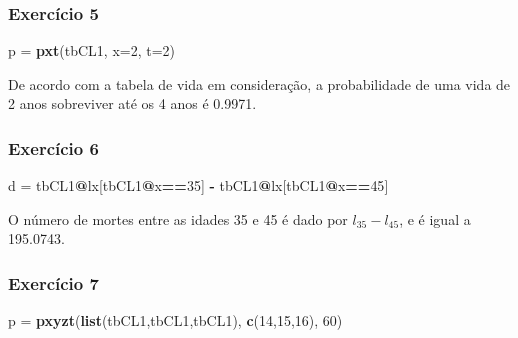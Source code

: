\documentclass[]{article}
\newenvironment{Shaded}{\begin{snugshade}}{\end{snugshade}}
\newcommand{\DataTypeTok}[1]{\textcolor[rgb]{0.13,0.29,0.53}{#1}}
\newcommand{\DecValTok}[1]{\textcolor[rgb]{0.00,0.00,0.81}{#1}}
\newcommand{\KeywordTok}[1]{\textcolor[rgb]{0.13,0.29,0.53}{\textbf{#1}}}
\newcommand{\NormalTok}[1]{#1}
\newcommand{\OperatorTok}[1]{\textcolor[rgb]{0.81,0.36,0.00}{\textbf{#1}}}
\newcommand{\StringTok}[1]{\textcolor[rgb]{0.31,0.60,0.02}{#1}}
\begin{document}
\hypertarget{exercicio-5}{%
\subsubsection{Exercício 5}\label{exercicio-5}}

\begin{Shaded}
\begin{Highlighting}[]
\NormalTok{p =}\StringTok{ }\KeywordTok{pxt}\NormalTok{(tbCL1, }\DataTypeTok{x=}\DecValTok{2}\NormalTok{, }\DataTypeTok{t=}\DecValTok{2}\NormalTok{)}
\end{Highlighting}
\end{Shaded}

De acordo com a tabela de vida em consideração, a probabilidade de uma
vida de 2 anos sobreviver até os 4 anos é 0.9971.

\hypertarget{exercicio-6}{%
\subsubsection{Exercício 6}\label{exercicio-6}}

\begin{Shaded}
\begin{Highlighting}[]
\NormalTok{d =}\StringTok{ }\NormalTok{tbCL1}\OperatorTok{@}\NormalTok{lx[tbCL1}\OperatorTok{@}\NormalTok{x}\OperatorTok{==}\DecValTok{35}\NormalTok{] }\OperatorTok{-}\StringTok{ }\NormalTok{tbCL1}\OperatorTok{@}\NormalTok{lx[tbCL1}\OperatorTok{@}\NormalTok{x}\OperatorTok{==}\DecValTok{45}\NormalTok{]}
\end{Highlighting}
\end{Shaded}

O número de mortes entre as idades 35 e 45 é dado por
\(l_{35} - l_{45}\), e é igual a 195.0743.

\hypertarget{exercicio-7}{%
\subsubsection{Exercício 7}\label{exercicio-7}}

\begin{Shaded}
\begin{Highlighting}[]
\NormalTok{p =}\StringTok{ }\KeywordTok{pxyzt}\NormalTok{(}\KeywordTok{list}\NormalTok{(tbCL1,tbCL1,tbCL1), }\KeywordTok{c}\NormalTok{(}\DecValTok{14}\NormalTok{,}\DecValTok{15}\NormalTok{,}\DecValTok{16}\NormalTok{), }\DecValTok{60}\NormalTok{)}
\end{Highlighting}
\end{Shaded}
\end{document}
